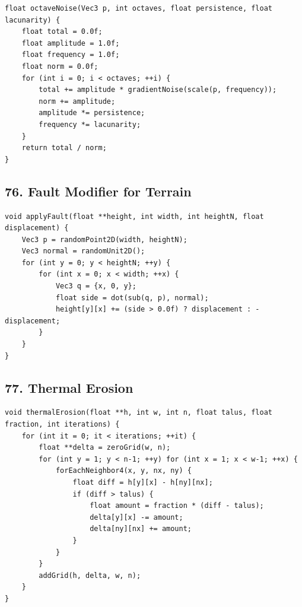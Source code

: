 \documentclass[10pt,letterpaper]{article}
\begin{document}
\begin{verbatim}
float octaveNoise(Vec3 p, int octaves, float persistence, float lacunarity) {
    float total = 0.0f;
    float amplitude = 1.0f;
    float frequency = 1.0f;
    float norm = 0.0f;
    for (int i = 0; i < octaves; ++i) {
        total += amplitude * gradientNoise(scale(p, frequency));
        norm += amplitude;
        amplitude *= persistence;
        frequency *= lacunarity;
    }
    return total / norm;
}
\end{verbatim}

\subsection*{76. Fault Modifier for Terrain}
{}

\begin{verbatim}
void applyFault(float **height, int width, int heightN, float displacement) {
    Vec3 p = randomPoint2D(width, heightN);
    Vec3 normal = randomUnit2D();
    for (int y = 0; y < heightN; ++y) {
        for (int x = 0; x < width; ++x) {
            Vec3 q = {x, 0, y};
            float side = dot(sub(q, p), normal);
            height[y][x] += (side > 0.0f) ? displacement : -displacement;
        }
    }
}
\end{verbatim}

\subsection*{77. Thermal Erosion}
{}

\begin{verbatim}
void thermalErosion(float **h, int w, int n, float talus, float fraction, int iterations) {
    for (int it = 0; it < iterations; ++it) {
        float **delta = zeroGrid(w, n);
        for (int y = 1; y < n-1; ++y) for (int x = 1; x < w-1; ++x) {
            forEachNeighbor4(x, y, nx, ny) {
                float diff = h[y][x] - h[ny][nx];
                if (diff > talus) {
                    float amount = fraction * (diff - talus);
                    delta[y][x] -= amount;
                    delta[ny][nx] += amount;
                }
            }
        }
        addGrid(h, delta, w, n);
    }
}
\end{verbatim}

\end{document}
